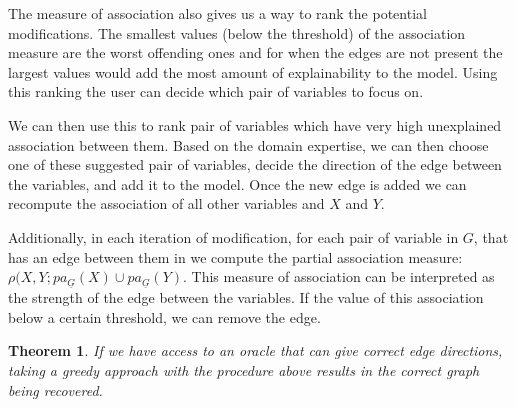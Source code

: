 \documentclass{uai2025} %
\newtheorem{theorem}{Theorem}
\begin{document}
The measure of association also gives us a way to rank the potential
modifications. The smallest values (below the threshold) of the association
measure are the worst offending ones and for when the edges are not present the
largest values would add the most amount of explainability to the model. Using
this ranking the user can decide which pair of variables to focus on.

We can then use this to rank pair of variables which have very high unexplained
association between them. Based on the domain expertise, we can then choose one
of these suggested pair of variables, decide the direction of the edge between
the variables, and add it to the model. Once the new edge is added we can
recompute the association of all other variables and $ X $ and $ Y $.

Additionally, in each iteration of modification, for each pair of variable in $
G $, that has an edge between them in we compute the partial association
measure: $ \rho(X, Y; pa_{\underline{G}}(X) \cup pa_{\underline{G}}(Y) $. This
measure of association can be interpreted as the strength of the edge between
the variables. If the value of this association below a certain threshold, we
can remove the edge.

\begin{theorem}
	If we have access to an oracle that can give correct edge directions, taking a
	greedy approach with the procedure above results in the correct graph
	being recovered. 
\end{theorem}
\end{document}
